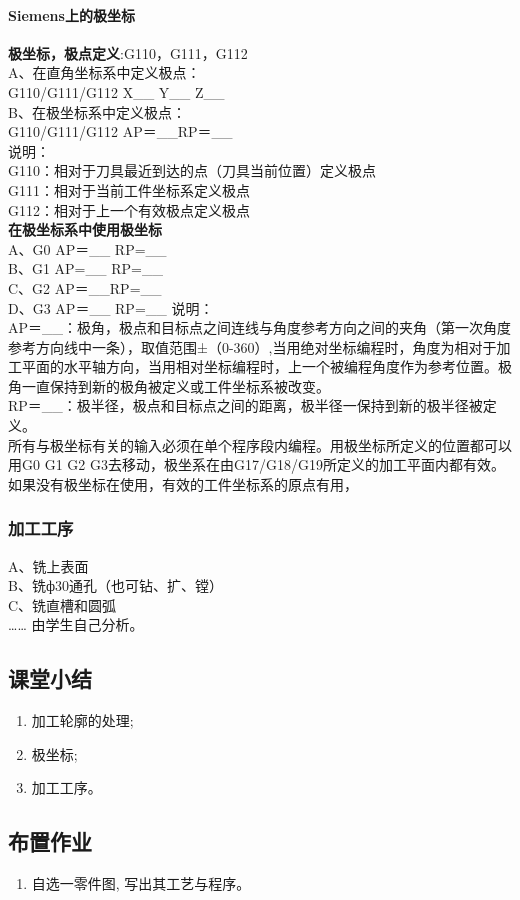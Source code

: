 \paragraph{Siemens上的极坐标}
\textbf{极坐标，极点定义}:G110，G111，G112 \\
A、在直角坐标系中定义极点：\\
G110/G111/G112 X\_\_ Y\_\_ Z\_\_\\
B、在极坐标系中定义极点：\\
G110/G111/G112 AP＝\_\_RP＝\_\_\\
说明： \\
G110：相对于刀具最近到达的点（刀具当前位置）定义极点\\
G111：相对于当前工件坐标系定义极点\\
G112：相对于上一个有效极点定义极点\\
\textbf{在极坐标系中使用极坐标}\\
A、G0 AP＝\_\_ RP=\_\_\\
B、G1 AP=\_\_ RP=\_\_\\
C、G2 AP＝\_\_RP=\_\_\\
D、G3 AP＝\_\_ RP=\_\_
说明：\\
AP＝\_\_：极角，极点和目标点之间连线与角度参考方向之间的夹角（第一次角度参考方向线中一条），取值范围±（0-360）,当用绝对坐标编程时，角度为相对于加工平面的水平轴方向，当用相对坐标编程时，上一个被编程角度作为参考位置。极角一直保持到新的极角被定义或工件坐标系被改变。\\
RP＝\_\_：极半径，极点和目标点之间的距离，极半径一保持到新的极半径被定义。\\
所有与极坐标有关的输入必须在单个程序段内编程。用极坐标所定义的位置都可以用G0 G1 G2 G3去移动，极坐系在由G17/G18/G19所定义的加工平面内都有效。如果没有极坐标在使用，有效的工件坐标系的原点有用，\\
\subsubsection{加工工序} 
A、铣上表面\\
B、铣ф30通孔（也可钻、扩、镗）\\
C、铣直槽和圆弧\\
……
由学生自己分析。\\


















\subsection{课堂小结}
\begin{enumerate}[1、]
	\item 加工轮廓的处理;
	\item 极坐标;
	\item 加工工序。
\end{enumerate}

\vfill
\subsection{布置作业}
\begin{enumerate}[1、]
	\item 自选一零件图, 写出其工艺与程序。 
\end{enumerate}
\vfill